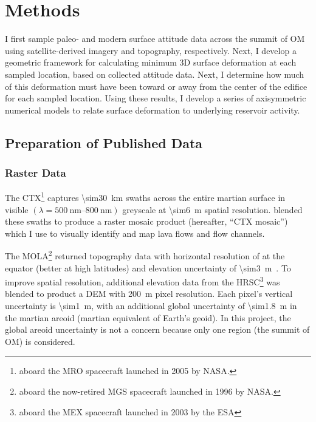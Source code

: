\chapter{Methods}\label{cha:methods}

I first sample paleo- and modern surface attitude data across the summit of \acl{OM} using satellite-derived imagery and topography, respectively. Next, I develop a geometric framework for calculating minimum 3D surface deformation at each sampled location, based on collected attitude data. Next, I determine how much of this deformation must have been toward or away from the center of the edifice for each sampled location. Using these results, I develop a series of axisymmetric numerical models to relate surface deformation to underlying reservoir activity.

\section{Preparation of Published Data}

\subsection{Raster Data}
The \acf{CTX}\footnote{aboard the \ac{MRO} spacecraft launched in 2005 by \acs{NASA}.} captures \qty{\sim30}{\km} swaths across the entire martian surface in visible $(\lambda=\qtyrange{500}{800}{\nm})$ greyscale at \qty{\sim6}{\m} spatial resolution. \textcite{Dickson2018AGB} blended these swaths to produce a raster mosaic product (hereafter, ``\ac{CTX} mosaic'') which I use to visually identify and map lava flows and flow channels.

The \acf{MOLA}\footnote{aboard the now-retired \ac{MGS} spacecraft launched in 1996 by \acs{NASA}.} returned topography data with horizontal resolution of  at the equator (better at high latitudes) and elevation uncertainty of \qty{\sim3}{\m}~\parencite{smith_mars_2001}. To improve spatial resolution, additional elevation data from the \ac{HRSC}\footnote{aboard the \ac{MEX} spacecraft launched in 2003 by the \ac{ESA}} was blended to product a \ac{DEM} with \qty{200}{\m} pixel resolution. Each pixel's vertical uncertainty is \qty{\sim1}{\m}, with an additional global uncertainty of \qty{\sim1.8}{\m} in the martian areoid (martian equivalent of Earth's geoid). In this project, the global areoid uncertainty is not a concern because only one region (the summit of \ac{OM}) is considered.


